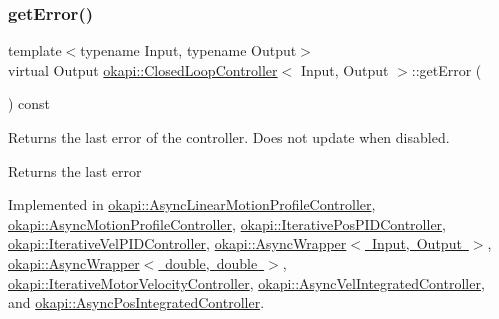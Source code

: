 \mbox{\label{classokapi_1_1ClosedLoopController_a50c73444ff6e3e631951c43d0f951953}} 
\subsubsection{\texorpdfstring{getError()}{getError()}}
{\footnotesize\ttfamily template$<$typename Input, typename Output$>$ \\
virtual Output \mbox{\hyperlink{classokapi_1_1ClosedLoopController}{okapi\+::\+Closed\+Loop\+Controller}}$<$ Input, Output $>$\+::get\+Error (\begin{DoxyParamCaption}{ }\end{DoxyParamCaption}) const\hspace{0.3cm}{\ttfamily [pure virtual]}}

Returns the last error of the controller. Does not update when disabled.

\begin{DoxyReturn}{Returns}
the last error 
\end{DoxyReturn}


Implemented in \mbox{\hyperlink{classokapi_1_1AsyncLinearMotionProfileController_a31057c2bb8cface61147b1edd0d97ce5}{okapi\+::\+Async\+Linear\+Motion\+Profile\+Controller}}, \mbox{\hyperlink{classokapi_1_1AsyncMotionProfileController_aeb60fb677877b3461c1232dda7d0db50}{okapi\+::\+Async\+Motion\+Profile\+Controller}}, \mbox{\hyperlink{classokapi_1_1IterativePosPIDController_a632611340113011f75c7ee1c389231e3}{okapi\+::\+Iterative\+Pos\+P\+I\+D\+Controller}}, \mbox{\hyperlink{classokapi_1_1IterativeVelPIDController_a7e60b432a91d73db0a62c5d31759ed10}{okapi\+::\+Iterative\+Vel\+P\+I\+D\+Controller}}, \mbox{\hyperlink{classokapi_1_1AsyncWrapper_a64b690883ff7475375a6d08ad3fb62f9}{okapi\+::\+Async\+Wrapper$<$ Input, Output $>$}}, \mbox{\hyperlink{classokapi_1_1AsyncWrapper_a64b690883ff7475375a6d08ad3fb62f9}{okapi\+::\+Async\+Wrapper$<$ double, double $>$}}, \mbox{\hyperlink{classokapi_1_1IterativeMotorVelocityController_aee5e0bfdaa45c2748b9f4bf8b549f286}{okapi\+::\+Iterative\+Motor\+Velocity\+Controller}}, \mbox{\hyperlink{classokapi_1_1AsyncVelIntegratedController_a6641352cebd3f0baa4e3e1ab4ad27be3}{okapi\+::\+Async\+Vel\+Integrated\+Controller}}, and \mbox{\hyperlink{classokapi_1_1AsyncPosIntegratedController_a82aeb0cb2d1aab524b9a79a249260e11}{okapi\+::\+Async\+Pos\+Integrated\+Controller}}.

